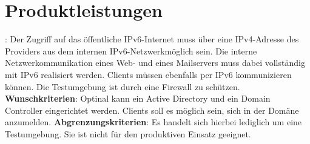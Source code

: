 \section{Produktleistungen}

: Der Zugriff auf das öffentliche IPv6-Internet muss über eine IPv4-Adresse des Providers aus dem internen IPv6-Netzwerkmöglich sein. Die interne Netzwerkommunikation eines Web- und eines Mailservers muss dabei vollständig mit IPv6 realisiert werden. Clients müssen ebenfalls per IPv6 kommunizieren können. Die Testumgebung ist durch eine Firewall zu schützen. {\bf Wunschkriterien}: Optinal kann ein Active Directory und ein Domain Controller eingerichtet werden. Clients soll es möglich sein, sich in der Domäne anzumelden. {\bf Abgrenzungskriterien}: Es handelt sich hierbei lediglich um eine Testumgebung. Sie ist nicht für den produktiven Einsatz geeignet.
